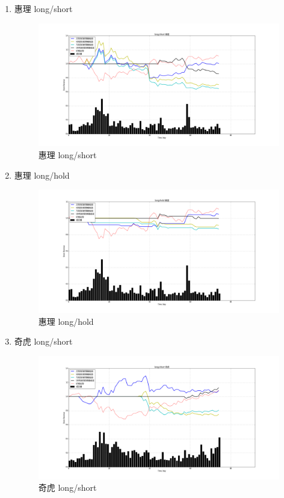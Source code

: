 \documentclass[12pt,a4paper]{article}
\begin{document}
\begin{enumerate}[1.]
\item 惠理 long/short


\begin{figure}[H]
	\centering
	\includegraphics[width=1.0\textwidth]{img_r_5/short/hl.png}
	\caption{惠理 long/short }
\end{figure}

\item 惠理 long/hold

\begin{figure}[H]
	\centering
	\includegraphics[width=1.0\textwidth]{img_r_5/hold/hl.png}
	\caption{惠理 long/hold}
\end{figure}

\item 奇虎 long/short


\begin{figure}[H]
	\centering
	\includegraphics[width=1.0\textwidth]{img_r_5/short/qihu.png}
	\caption{奇虎 long/short}
\end{figure}


\end{enumerate}
\end{document}
